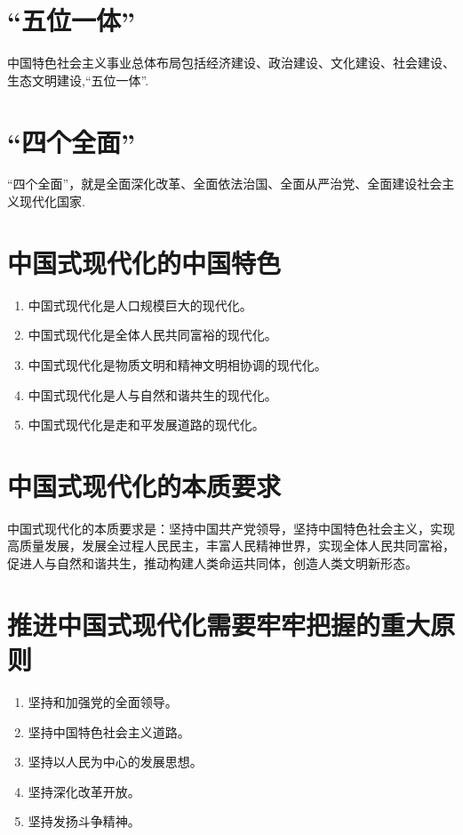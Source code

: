 \documentclass[12pt, a4paper, oneside]{ctexbook}
\begin{document}
\section{“五位一体”}

中国特色社会主义事业总体布局包括经济建设、政治建设、文化建设、社会建设、生态文明建设,“五位一体”.

\section{“四个全面”}

“四个全面”，就是全面深化改革、全面依法治国、全面从严治党、全面建设社会主义现代化国家.

\section{中国式现代化的中国特色}

\begin{enumerate}
\item 中国式现代化是人口规模巨大的现代化。

\item 中国式现代化是全体人民共同富裕的现代化。

\item 中国式现代化是物质文明和精神文明相协调的现代化。

\item 中国式现代化是人与自然和谐共生的现代化。

\item 中国式现代化是走和平发展道路的现代化。
\end{enumerate}

\section{中国式现代化的本质要求}

中国式现代化的本质要求是：坚持中国共产党领导，坚持中国特色社会主义，实现高质量发展，发展全过程人民民主，丰富人民精神世界，实现全体人民共同富裕，促进人与自然和谐共生，推动构建人类命运共同体，创造人类文明新形态。

\section{推进中国式现代化需要牢牢把握的重大原则}

\begin{enumerate}
\item 坚持和加强党的全面领导。

\item 坚持中国特色社会主义道路。

\item 坚持以人民为中心的发展思想。

\item 坚持深化改革开放。

\item 坚持发扬斗争精神。
\end{enumerate}
\end{document}
